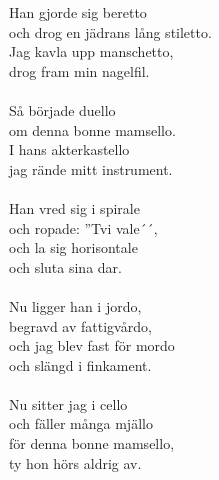 Han gjorde sig beretto\\
och drog en jädrans lång stiletto.\\
Jag kavla upp manschetto,\\
drog fram min nagelfil.\\
\\
Så började duello\\
om denna bonne mamsello.\\
I hans akterkastello\\
jag rände mitt instrument.\\
\\
Han vred sig i spirale\\
och ropade: ''Tvi vale´´,\\
och la sig horisontale\\
och sluta sina dar.\\
\\
Nu ligger han i jordo,\\
begravd av fattigvårdo,\\
och jag blev fast för mordo\\
och slängd i finkament.\\
\\
Nu sitter jag i cello\\
och fäller många mjällo\\
för denna bonne mamsello,\\
ty hon hörs aldrig av.
